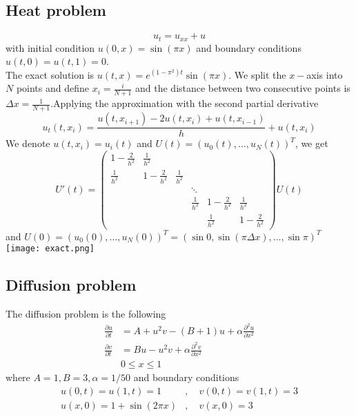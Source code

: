 \documentclass{article}
\theoremstyle{theorem}
\theoremstyle{definition}
\begin{document}
	\subsection{Heat problem}
	$$u_t=u_{xx}+u$$ with initial condition $u(0,x)=\sin(\pi x)$ and boundary conditions $u(t,0)=u(t,1)=0$.\\
	The exact solution is $u(t,x)=e^{(1-\pi^2)t} \sin(\pi x)$. We split the $x-$axis into $N$ points and define $x_i = \frac{i}{N+1}$ and the distance between two consecutive points is $\Delta x = \frac{1}{N+1}$.Applying the  approximation with the second partial derivative $$u_t(t,x_i)= \frac{u(t,x_{i+1})-2u(t,x_i)+u(t,x_{i-1})}{h}+u(t,x_i)$$  We denote $u(t,x_i)=u_i(t)$ and $U(t)=(u_0(t), \dots , u_N(t))^T$, we get\\
	$$U'(t)=\begin{pmatrix}
	1-\frac{2}{h^2} &\frac{1}{h^2}  &  &  &  & \\ 
	\frac{1}{h^2}& 1-\frac{2}{h^2} &\frac{1}{h^2}  &  &  & \\ 
	&  &  & \ddots &  & \\ 
	&  &  & \frac{1}{h^2} & 1-\frac{2}{h^2} & \frac{1}{h^2}\\ 
	&  &  &  & \frac{1}{h^2} &1-\frac{2}{h^2} 
	\end{pmatrix} U(t) $$
	and $U(0)=(u_0(0), \dots , u_N(0))^T= (\sin 0 , \sin (\pi \Delta x) , \dots , \sin \pi)^T$ \\
		\texttt{[image: exact.png]}
\subsection{Diffusion problem}	The diffusion problem is the following
$$\begin{aligned}\frac{\partial u}{\partial t}&=A+u^2v-(B+1)u+\alpha \frac{\partial^2u}{\partial x^2} \\ \frac{\partial v}{\partial t}&=Bu-u^2v+\alpha \frac{\partial^2v}{\partial x^2} \\
& 0 \le x \le 1 \end{aligned}$$
where $A=1,B=3, \alpha = 1/50$ and boundary conditions $$\begin{aligned} u(0,t)=u(1,t)=1&, \quad v(0,t)=v(1,t)=3 \\
u(x,0)=1+\sin(2\pi x)&, \quad v(x,0)=3 \end{aligned}$$
\end{document}

